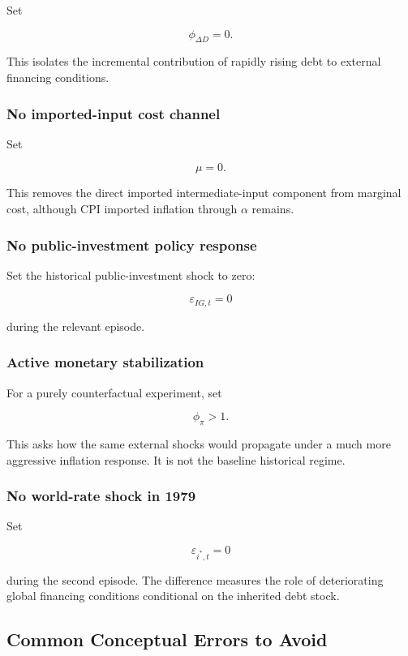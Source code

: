 Set

\[
\phi_{\Delta D}=0.
\]

This isolates the incremental contribution of rapidly rising debt to external
financing conditions.

\subsubsection{No imported-input cost channel}

Set

\[
\mu=0.
\]

This removes the direct imported intermediate-input component from marginal
cost, although CPI imported inflation through \(\alpha\) remains.

\subsubsection{No public-investment policy response}

Set the historical public-investment shock to zero:

\[
\varepsilon_{IG,t}=0
\]

during the relevant episode.

\subsubsection{Active monetary stabilization}

For a purely counterfactual experiment, set

\[
\phi_\pi>1.
\]

This asks how the same external shocks would propagate under a much more
aggressive inflation response. It is not the baseline historical regime.

\subsubsection{No world-rate shock in 1979}

Set

\[
\varepsilon_{i^*,t}=0
\]

during the second episode. The difference measures the role of deteriorating
global financing conditions conditional on the inherited debt stock.

\subsection{Common Conceptual Errors to Avoid}
\label{app:errors}


